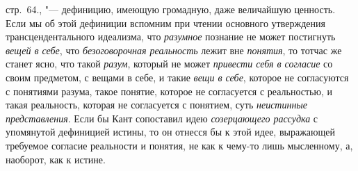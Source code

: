{{стр.~64.\label{bkm:bm09}},
"--- дефиницию, имеющую громадную, даже величайшую ценность.
Если мы об этой дефиниции вспомним при чтении основного утверждения
трансцендентального идеализма, что
{\em разумное} познание
не может постигнуть {\em вещей в себе},
что {\em безоговорочная
реальность} лежит вне
{\em понятия}, то тотчас
же станет ясно, что такой {\em разум},
который не может
{\em привести себя в согласие}
со своим предметом, с вещами в себе, и такие
{\em вещи в себе},
которое не согласуются с понятиями разума, такое понятие,
которое не согласуется с реальностью, и такая реальность, которая не
согласуется с понятием, суть
{\em неистинные представления}.
Если бы Кант сопоставил идею
{\em созерцающего рассудка}
с упомянутой дефиницией истины, то он отнесся бы к этой идее,
выражающей требуемое согласие реальности и понятия, не как к чему-то лишь
мысленному, а, наоборот, как к истине.

}
